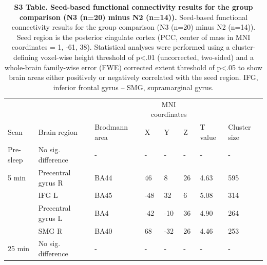 \begin{table}[htb]
    \caption*{\textbf{S3 Table. Seed-based functional connectivity results for the group comparison (N3 (n=20) minus N2 (n=14)).} Seed-based functional connectivity results for the group comparison (N3 (n=20) minus N2 (n=14)). Seed region is the posterior cingulate cortex (PCC, center of mass in MNI coordinates = 1, -61, 38). Statistical analyses were performed using a cluster-defining voxel-wise height threshold of p<.01 (uncorrected, two-sided) and a whole-brain family-wise error (FWE) corrected extent threshold of p<.05 to show brain areas either positively or negatively correlated with the seed region. IFG, inferior frontal gyrus – SMG, supramarginal gyrus.}
    \begin{tabularx}{\textwidth}{XXXllllX}
    \toprule
    &         &                    & \multicolumn{3}{c}{MNI coordinates}                 &              &              \\
    Scan      & Brain region       & Brodmann area & X          & Y          & Z         & T value 		& Cluster size \\ \midrule
    Pre-sleep & No sig. difference & -             & -          & -          & -         & -            & -            \\
    5 min     & Precentral gyrus R & BA44          & 46         & 8          & 26        & 4.63         & 595          \\
              & IFG L              & BA45          & -48        & 32         & 6         & 5.08         & 314          \\
              & Precentral gyrus L & BA4           & -42        & -10        & 36        & 4.90         & 264          \\
              & SMG R              & BA40          & 68         & -32        & 26        & 4.46         & 253          \\
    25 min    & No sig. difference & -             & -          & -          & -         & -            & -            \\ \toprule
    \end{tabularx}%
\end{table}
